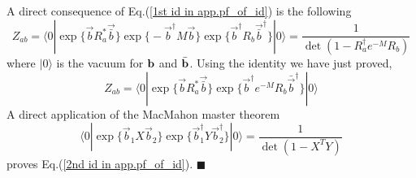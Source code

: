 A direct consequence of Eq.(\ref{1st id in app.pf_of_id}) is the following
\begin{equation}
\label{2nd id in app.pf_of_id}
Z_{ab} = \langle 0 | \exp\Big\{ \vec{b} R_a^* \vec{\bar{b}}\Big\} \exp\Big\{ - \vec{b}^{\dagger} M  \vec{b} \Big\}   \exp\Big\{  \vec{b}^{\dagger} R_b  \vec{\bar{b}}^{\dagger}\Big\}  |0  \rangle  = \frac{1}{\det( 1- R_a^{\dagger} e^{-M} R_b )} 
\end{equation}
where $|0\rangle$ is the vacuum for ${\bf b}$ and $\bar{\bf b}$. Using the identity we have just proved, 
\begin{equation}
Z_{ab} =   \langle 0 | \exp\Big\{ \vec{b} R_a^* \vec{\bar{b}}\Big\}  \exp \Big\{ \vec{b}^{\dagger} e^{-M}  R_b \bar{\vec{b}}^{\dagger}  \Big\}  |0 \rangle 
\end{equation}
A direct application of the MacMahon master theorem
\begin{equation}
  \langle 0 | \exp \Big\{ \vec{b}_1 X \vec{b}_2 \Big\}  \exp \Big\{ \vec{b}^{\dagger}_1 Y \vec{b}^{\dagger}_2 \Big\}|0  \rangle 
 = \frac{1}{\det(1 - X^T Y )}
\end{equation}
proves Eq.(\ref{2nd id in app.pf_of_id}). \hfill$\blacksquare$




